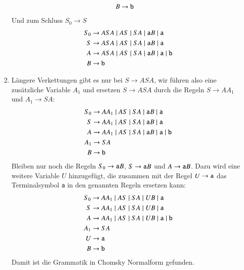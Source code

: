 \begin{enumerate}
\begin{align*}
B&\to{\tt b}
\end{align*}
Und zum Schluss $S_0\to S$
\begin{align*}
S_0&\to ASA \;|\; AS \;|\; SA \;|\; {\tt a}B\;|\;{\tt a}\\
S&\to ASA \;|\; AS \;|\; SA \;|\; {\tt a}B\;|\;{\tt a}\\
A&\to ASA \;|\; AS \;|\; SA \;|\; {\tt a}B\;|\;{\tt a}\;|\;{\tt b}\\
B&\to{\tt b}
\end{align*}
\item Längere Verkettungen gibt es nur bei $S\to ASA$, wir führen
also eine zusätzliche Variable $A_1$ und ersetzen $S\to ASA$ durch
die Regeln $S\to AA_1$ und $A_1\to SA$:
\begin{align*}
S_0&\to AA_1 \;|\; AS \;|\; SA \;|\; {\tt a}B\;|\;{\tt a}\\
S&\to AA_1 \;|\; AS \;|\; SA \;|\; {\tt a}B\;|\;{\tt a}\\
A&\to AA_1 \;|\; AS \;|\; SA \;|\; {\tt a}B\;|\;{\tt a} \;|\; {\tt b}\\
A_1&\to SA\\
B&\to{\tt b}
\end{align*}
Bleiben nur noch die Regeln $S_0\to{\tt a}B$, $S\to{\tt a}B$ und
$A\to{\tt a}B$.
Dazu wird eine weitere Variable $U$ hinzugefügt, die zusammen mit
der Regel $U\to{\tt a}$ das Terminalsymbol {\tt a} in den genannten
Regeln ersetzen kann:
\begin{align*}
S_0&\to AA_1 \;|\; AS \;|\; SA \;|\; UB\;|\;{\tt a}\\
S&\to AA_1 \;|\; AS \;|\; SA \;|\; UB\;|\;{\tt a}\\
A&\to AA_1 \;|\; AS \;|\; SA \;|\; UB\;|\;{\tt a} \;|\; {\tt b}\\
A_1&\to SA\\
U&\to {\tt a}\\
B&\to{\tt b}
\end{align*}
Damit ist die Grammatik in Chomsky Normalform gefunden.
\end{enumerate}

